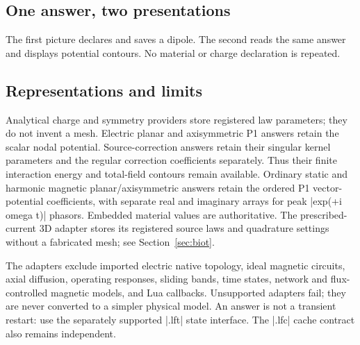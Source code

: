\subsection{One answer, two presentations}
The first picture declares and saves a dipole. The second reads the same answer
and displays potential contours. No material or charge declaration is repeated.
\begin{codeexample}[width=5cm]
\end{codeexample}
\begin{codeexample}[width=5cm]
\end{codeexample}

\subsection{Representations and limits}
Analytical charge and symmetry providers store registered law parameters;
they do not invent a mesh. Electric planar and axisymmetric P1 answers retain
the scalar nodal potential. Source-correction answers retain their singular
kernel parameters and the regular correction coefficients separately. Thus
their finite interaction energy and total-field contours remain available.
Ordinary static and harmonic magnetic planar/axisymmetric answers retain
the ordered P1 vector-potential coefficients, with separate real and imaginary
arrays for peak |exp(+i omega t)| phasors. Embedded material values are authoritative.
The prescribed-current 3D adapter stores its registered source laws and quadrature
settings without a fabricated mesh; see Section~\ref{sec:biot}.

The adapters exclude imported electric native topology, ideal magnetic circuits,
axial diffusion, operating responses, sliding bands, time states, network and
flux-controlled magnetic models, and Lua callbacks. Unsupported adapters fail;
they are never converted to a simpler physical model. An answer is not a
transient restart: use the separately supported |.lft| state interface.
The |.lfc| cache contract also remains independent.

